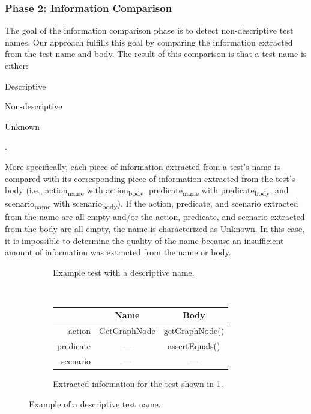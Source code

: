 \documentclass[proposal.tex]{subfiles}
\begin{document}
\subsubsection{Phase 2: Information Comparison}


The goal of the information comparison phase is to detect non-descriptive test names.
%
Our approach fulfills this goal by comparing the information extracted from the test name and body.
%
The result of this comparison is that a test name is either:
\begin{enumerate*}[itemjoin*={{, or }}]
    \item Descriptive
    \item Non-descriptive
    \item Unknown
\end{enumerate*}.


More specifically, each piece of information extracted from a test's name is compared with its corresponding piece of information extracted from the test's body (i.e., action\textsubscript{name} with action\textsubscript{body}, predicate\textsubscript{name} with predicate\textsubscript{body}, and scenario\textsubscript{name} with scenario\textsubscript{body}).
% 
If the action, predicate, and scenario extracted from the name are all empty and\slash or the action, predicate, and scenario extracted from the body are all empty, the name is characterized as Unknown.
%
In this case, it is impossible to determine the quality of the name because an insufficient amount of information was extracted from the name or body.


\begin{figure}[t]
    \centering
    \begin{subfigure}{0.9\textwidth}
    \centering
        \caption{Example test with a descriptive name.}
        \label{PatternExample_detected4_code}
    \end{subfigure}
    \\[0.5ex]
    \begin{subfigure}{0.9\textwidth}
    \centering
        \begin{tabular}{rcc}
        \toprule
                  & Name    & Body    \\
        \midrule
        action    & GetGraphNode  & getGraphNode()     \\
        predicate & ---           & assertEquals()     \\
        scenario  & ---           & ---                \\
        \bottomrule
        \end{tabular}
        \caption{Extracted information for the test shown in \cref{PatternExample_detected4_code}.}
        \label{PatternExample_detected4}
    \end{subfigure}
    \caption{Example of a descriptive test name.}
    \label{fig:descriptive-examples}
\end{figure}
\end{document}
